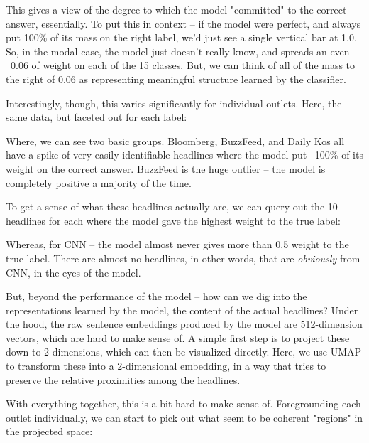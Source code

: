 \documentclass{scrartcl}
\begin{document}

This gives a view of the degree to which the model "committed" to the correct answer, essentially. To put this in context -- if the model were perfect, and always put 100\% of its mass on the right label, we'd just see a single vertical bar at 1.0. So, in the modal case, the model just doesn't really know, and spreads an even ~0.06 of weight on each of the 15 classes. But, we can think of all of the mass to the right of 0.06 as representing meaningful structure learned by the classifier.

Interestingly, though, this varies significantly for individual outlets. Here, the same data, but faceted out for each label:


Where, we can see two basic groups. Bloomberg, BuzzFeed, and Daily Kos all have a spike of very easily-identifiable headlines where the model put ~100\% of its weight on the correct answer. BuzzFeed is the huge outlier -- the model is completely positive a majority of the time.


To get a sense of what these headlines actually are, we can query out the 10 headlines for each where the model gave the highest weight to the true label:


Whereas, for CNN -- the model almost never gives more than 0.5 weight to the true label. There are almost no headlines, in other words, that are \textit{obviously} from CNN, in the eyes of the model.


But, beyond the performance of the model -- how can we dig into the representations learned by the model, the content of the actual headlines? Under the hood, the raw sentence embeddings produced by the model are 512-dimension vectors, which are hard to make sense of. A simple first step is to project these down to 2 dimensions, which can then be visualized directly. Here, we use UMAP\cite{mcinnes2018umap-software} to transform these into a 2-dimensional embedding, in a way that tries to preserve the relative proximities among the headlines.


With everything together, this is a bit hard to make sense of. Foregrounding each outlet individually, we can start to pick out what seem to be coherent "regions" in the projected space:
\end{document}
